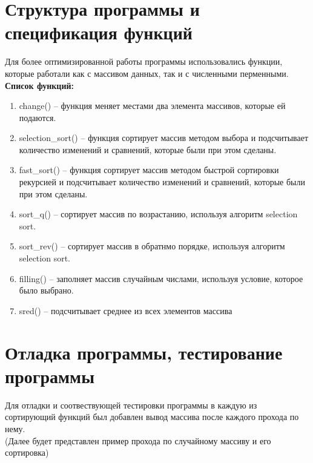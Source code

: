 \documentclass[a4paper,10pt]{article}
\begin{document}
    \newpage
    \section{Структура программы и спецификация функций}
    \vspace{0,5cm}
    Для более оптимизированной работы программы использовались функции, которые работали как с массивом данных, так и с численными перменными.
    \vspace{0.5cm}\\
    \textbf{Список функций:}\\
    \begin{enumerate}
        \item change() -- функция меняет местами два элемента массивов, которые ей подаются.
        \item selection\_sort() -- функция сортирует массив методом выбора и подсчитывает количество изменений и сравнений, которые были при этом сделаны.
        \item fast\_sort() -- функция сортирует массив методом быстрой сортировки рекурсией и подсчитывает количество изменений и сравнений, которые были при этом сделаны.
        \item sort\_q() -- сортирует массив по возрастанию, используя алгоритм selection sort.
        \item sort\_rev() -- сортирует массив в обратнмо порядке, используя алгоритм selection sort.
        \item filling() -- заполняет массив случайным числами, используя условие, которое было выбрано.
        \item sred() -- подсчитывает среднее из всех элементов массива
    \end{enumerate}
    \newpage
    \section{Отладка программы, тестирование программы}
    \vspace{0,5cm}
    Для отладки и соотвествующей тестировки программы в каждую из сортирующий функций был добавлен вывод массива после каждого прохода по нему.\\ 
    (Далее будет представлен пример прохода по случайному массиву и его сортировка)\\
    
\end{document}
